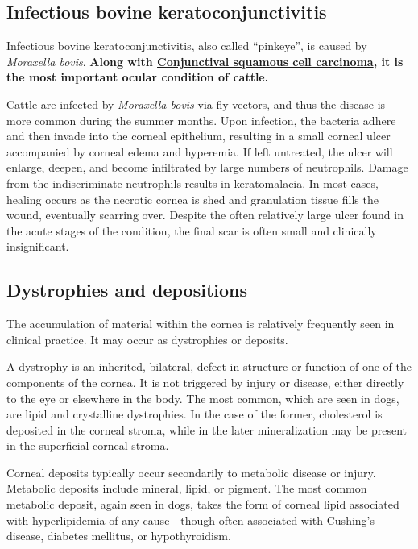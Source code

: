 \documentclass[openany]{article}
\begin{document}
\hypertarget{infectious-bovine-keratoconjunctivitis}{\subsection{Infectious
bovine
keratoconjunctivitis}\label{infectious-bovine-keratoconjunctivitis}}

Infectious bovine keratoconjunctivitis, also called ``pinkeye'', is
caused by \emph{Moraxella bovis}. \textbf{Along with
\protect\hyperlink{conjunctival-squamous-cell-carcinoma}{Conjunctival
squamous cell carcinoma}, it is the most important ocular condition of
cattle.}

Cattle are infected by \emph{Moraxella bovis} via fly vectors, and thus
the disease is more common during the summer months. Upon infection, the
bacteria adhere and then invade into the corneal epithelium, resulting
in a small corneal ulcer accompanied by corneal edema and hyperemia. If
left untreated, the ulcer will enlarge, deepen, and become infiltrated
by large numbers of neutrophils. Damage from the indiscriminate
neutrophils results in keratomalacia. In most cases, healing occurs as
the necrotic cornea is shed and granulation tissue fills the wound,
eventually scarring over. Despite the often relatively large ulcer found
in the acute stages of the condition, the final scar is often small and
clinically insignificant.

\subsection{Dystrophies and
depositions}\label{dystrophies-and-depositions}

The accumulation of material within the cornea is relatively frequently
seen in clinical practice. It may occur as dystrophies or deposits.

A dystrophy is an inherited, bilateral, defect in structure or function
of one of the components of the cornea. It is not triggered by injury or
disease, either directly to the eye or elsewhere in the body. The most
common, which are seen in dogs, are lipid and crystalline dystrophies.
In the case of the former, cholesterol is deposited in the corneal
stroma, while in the later mineralization may be present in the
superficial corneal stroma.

Corneal deposits typically occur secondarily to metabolic disease or
injury. Metabolic deposits include mineral, lipid, or pigment. The most
common metabolic deposit, again seen in dogs, takes the form of corneal
lipid associated with hyperlipidemia of any cause - though often
associated with Cushing's disease, diabetes mellitus, or hypothyroidism.
\end{document}
